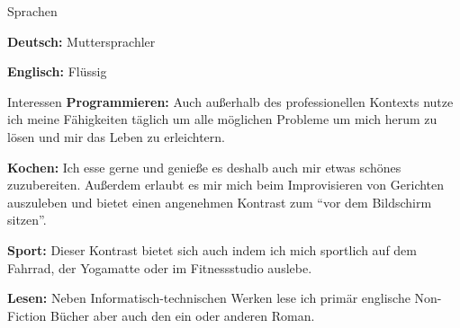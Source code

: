 \documentclass{cv}
\begin{document}
\begin{rSection}{Sprachen}
  \begin{minipage}[l]{0.48\linewidth}
  {\bf Deutsch:} Muttersprachler
  \end{minipage}
  \begin{minipage}[l]{0.48\linewidth}
  {\bf Englisch:} Flüssig \hfill
  \end{minipage}
\end{rSection}

\begin{rSection}{Interessen}
  {\bf Programmieren:} Auch außerhalb des professionellen Kontexts nutze ich meine
Fähigkeiten täglich um alle möglichen Probleme um mich herum zu lösen und mir
das Leben zu erleichtern.

  {\bf Kochen:} Ich esse gerne und genieße es deshalb auch mir etwas schönes
zuzubereiten. Außerdem erlaubt es mir mich beim Improvisieren von Gerichten
auszuleben und bietet einen angenehmen Kontrast zum ``vor dem Bildschirm sitzen''.

  {\bf Sport:} Dieser Kontrast bietet sich auch indem ich mich sportlich auf dem
Fahrrad, der Yogamatte oder im Fitnessstudio auslebe.

  {\bf Lesen:} Neben Informatisch-technischen Werken lese ich primär englische
Non-Fiction Bücher aber auch den ein oder anderen Roman.
\end{rSection}
\end{document}
